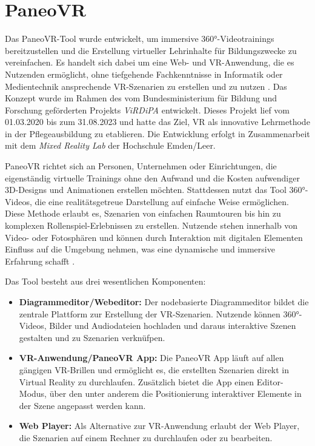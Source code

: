 \section{PaneoVR}

Das PaneoVR-Tool wurde entwickelt, um immersive 360°-Videotrainings bereitzustellen und die Erstellung virtueller Lehrinhalte für Bildungszwecke zu vereinfachen. Es handelt sich dabei um eine Web- und VR-Anwendung, die es Nutzenden ermöglicht, ohne tiefgehende Fachkenntnisse in Informatik oder Medientechnik ansprechende VR-Szenarien zu erstellen und zu nutzen \citep{paneovr-startseite}. Das Konzept wurde im Rahmen des vom Bundesministerium für Bildung und Forschung geförderten Projekts \textit{ViRDiPA} \citep{virdipa} entwickelt. Dieses Projekt lief vom 01.03.2020 bis zum 31.08.2023 und hatte das Ziel, VR als innovative Lehrmethode in der Pflegeausbildung zu etablieren. Die Entwicklung erfolgt in Zusammenarbeit mit dem \textit{Mixed Reality Lab} der Hochschule Emden/Leer.

PaneoVR richtet sich an Personen, Unternehmen oder Einrichtungen, die eigenständig virtuelle Trainings ohne den Aufwand und die Kosten aufwendiger 3D-Designs und Animationen erstellen möchten. Stattdessen nutzt das Tool 360°-Videos, die eine realitätsgetreue Darstellung auf einfache Weise ermöglichen. Diese Methode erlaubt es, Szenarien von einfachen Raumtouren bis hin zu komplexen Rollenspiel-Erlebnissen zu erstellen. Nutzende stehen innerhalb von Video- oder Fotosphären und können durch Interaktion mit digitalen Elementen Einfluss auf die Umgebung nehmen, was eine dynamische und immersive Erfahrung schafft \citep{paneovr-startseite}.

Das Tool besteht aus drei wesentlichen Komponenten:

\begin{itemize}
    \item \textbf{Diagrammeditor/Webeditor:}
    Der nodebasierte Diagrammeditor bildet die zentrale Plattform zur Erstellung der VR-Szenarien. Nutzende können 360°-Videos, Bilder und Audiodateien hochladen und daraus interaktive Szenen gestalten und zu Szenarien verknüfpen. 
    \item \textbf{VR-Anwendung/PaneoVR App:}
    Die PaneoVR App läuft auf allen gängigen VR-Brillen und ermöglicht es, die erstellten Szenarien direkt in Virtual Reality zu durchlaufen. Zusätzlich bietet die App einen Editor-Modus, über den unter anderem die Positionierung interaktiver Elemente in der Szene angepasst werden kann. 
    \item \textbf{Web Player:}
    Als Alternative zur VR-Anwendung erlaubt der Web Player, die Szenarien auf einem Rechner zu durchlaufen oder zu bearbeiten.
\end{itemize}

